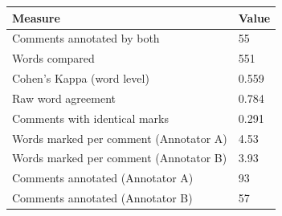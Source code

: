 \begin{tabular}{ll}
\toprule
Measure & Value \\
\midrule
Comments annotated by both & 55 \\
Words compared & 551 \\
Cohen's Kappa (word level) & 0.559 \\
Raw word agreement & 0.784 \\
Comments with identical marks & 0.291 \\
Words marked per comment (Annotator A) & 4.53 \\
Words marked per comment (Annotator B) & 3.93 \\
Comments annotated (Annotator A) & 93 \\
Comments annotated (Annotator B) & 57 \\
\bottomrule
\end{tabular}
